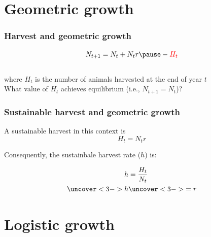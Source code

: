 \documentclass[color=usenames,dvipsnames]{beamer}\usepackage[]{graphicx}\usepackage[]{xcolor}
\begin{document}
\section{Geometric growth}




\begin{frame}
  \frametitle{Harvest and geometric growth}
  \Large
  \[
   N_{t+1} = N_t + N_tr \pause - \color{red}{H_t}
  \] \\
  \pause
  \large
  where $H_t$ is the number of animals harvested at the end of
  year $t$ \\
  \pause
  \vfill %
  What value of $H_t$ achieves equilibrium (i.e., $N_{t+1} = N_t$)? \\
\end{frame}




\begin{frame}
  \frametitle{Sustainable harvest and geometric growth}
  \large
  A sustainable harvest in this context is
  \LARGE
  \[
    H_t = N_tr
  \]
  \pause
  \large
  \vfill
  {%
    Consequently, the sustainbale harvest rate ($h$) is: \par}
  \LARGE
  \begin{align*}
    h &= \frac{H_t}{N_t} \\
    \uncover<3->{h}  &\uncover<3->{= r} \\
  \end{align*}
\end{frame}





\section{Logistic growth}


\end{document}
